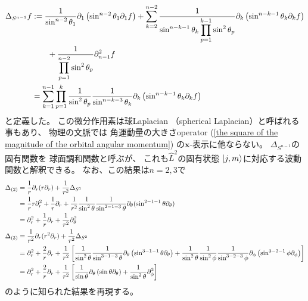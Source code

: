 \begin{align}
    \Delta_{S^{n-1}} f
&:=
        \dfrac{1}{
    \displaystyle
        \sin^{n - 2} \theta_1
    }
    \partial_1
    \left(
        \sin^{n - 2} \theta_1
        \partial_1
        f
    \right)
+
\sum_{k = 2}^{n-2}
    \dfrac{1}{
    \displaystyle
        \sin^{n - k - 1} \theta_k
        \prod_{p=1}^{k-1}
        \sin^{2} \theta_p
    }
    \partial_k
    \left(
        \sin^{n - k - 1} \theta_k
        \partial_k
        f
    \right)
\notag\\&\qquad
+
    \dfrac{1}{
    \displaystyle
        \prod_{p=1}^{n-2}
        \sin^{2} \theta_p
    }
    \partial_{n-1}^2
        f
\notag\\&
=
    \sum_{k = 1}^{n - 1}
    \prod_{p = 1}^{k}
    \dfrac{1}{\sin^2 \theta_p}
    \dfrac{1}{\sin^{n - k - 3} \theta_k}
    \partial_k
    \left(
        \sin^{n - k - 1} \theta_k
        \partial_k
        f
    \right)
\label{spherical Laplacian}
\end{align}
と定義した。
この微分作用素は球Laplacian
（spherical Laplacian）と呼ばれる事もあり、
物理の文脈では
角運動量の大きさoperator
(\ref{the square of the magnitude of the orbital angular momentum})
の$\bm{x}$-表示に他ならない。
$\Delta_{S^{n-1}}$の固有関数を
球面調和関数と呼ぶが、
これも$\hat{L}^2$の固有状態
$\ket{j, m}$に対応する波動関数と解釈できる。
なお、この結果は$n = 2,3$で
\begin{align}
    \Delta_{(2)}
    &=
    \dfrac{1}{r}
        \partial_r
        (r \partial_r)
    +
    \dfrac{1}{r^2}
    \Delta_{S^1}
\notag\\&
=
    \dfrac{1}{r}
        r \partial_r^2
    +
    \dfrac{1}{r}
        \partial_r
    +
    \dfrac{1}{r^2}
    \dfrac{1}{\sin^2 \theta}
    \dfrac{1}{\sin^{2-1-3} \theta}
    \partial_\theta
    (\sin^{2-1-1} \theta \partial_\theta)
\notag\\&
=
        \partial_r^2
    +
        \dfrac{1}{r}
        \partial_r
    +
    \dfrac{1}{r^2}
    \partial_\theta^2
\\
    \Delta_{(3)}
    &=
    \dfrac{1}{r^2}
        \partial_r
        (r^2 \partial_r)
    +
    \dfrac{1}{r^2}
    \Delta_{S^2}
\notag\\&
=
    \partial_r^2
    +
    \dfrac{2}{r}
        \partial_r
    +
    \dfrac{1}{r^2}
    \left[
        \dfrac{1}{\sin^2 \theta}
        \dfrac{1}{\sin^{3-1-3} \theta}
        \partial_\theta
        \left(
            \sin^{3-1-1} \theta
            \partial_\theta
        \right)
    +
        \dfrac{1}{\sin^2 \theta}
        \dfrac{1}{\sin^2 \phi}
        \dfrac{1}{\sin^{3-2-3} \phi}
        \partial_\phi
        \left(
            \sin^{3-2-1} \phi
            \partial_\phi
        \right)
    \right]
\notag\\&
=
    \partial_r^2
    +
    \dfrac{2}{r}
        \partial_r
    +
    \dfrac{1}{r^2}
    \left[
        \dfrac{1}{\sin \theta}
        \partial_\theta
        \left(
            \sin \theta
            \partial_\theta
        \right)
    +
        \dfrac{1}{\sin^2 \theta}
        \partial_\phi^2
    \right]
\end{align}
のように知られた結果を再現する。

